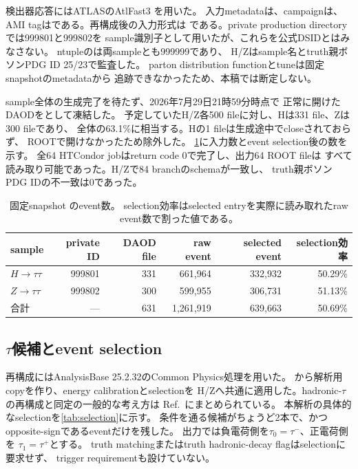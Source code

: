 \documentclass[xelatex,ja=standard,a4paper,10pt,twocolumn]{bxjsarticle}
\begin{document}
検出器応答にはATLASのAtlFast3
\cite{ATLASDetector,AtlFast3}を用いた。
入力metadataは、campaignは、
AMI tagはである。再構成後の入力形式は
である。private production directoryでは999801と999802を
sample識別子として用いたが、これらを公式DSIDとはみなさない。
ntupleのは両sampleとも999999であり、
H/Zはsample名とtruth親ボソンPDG ID 25/23で監査した。
parton distribution functionとtuneは固定snapshotのmetadataから
追跡できなかったため、本稿では断定しない。

sample全体の生成完了を待たず、2026年7月29日21時59分時点で
正常に開けたDAODをとして凍結した。
予定していたH/Z各500 fileに対し、Hは331 file、Zは300 fileであり、
全体の63.1\%に相当する。Hの1 fileは生成途中でcloseされておらず、
ROOTで開けなかったため除外した。
\cref{tab:sample_counts}に入力数とevent selection後の数を示す。
全64 HTCondor jobはreturn code 0で完了し、出力64 ROOT fileは
すべて読み取り可能であった。H/Zで84 branchのschemaが一致し、
truth親ボソンPDG IDの不一致は0であった。

\begin{table}[t]
  \centering
  \caption{固定snapshot のevent数。
    selection効率はselected entryを実際に読み取れたraw event数で割った値である。}
  \label{tab:sample_counts}
  \begin{tabular}{lrrrrr}
    \toprule
    sample & private ID & DAOD file & raw event & selected event & selection効率 \\
    \midrule
    \(H\rightarrow\tau\tau\) & 999801 & 331 & 661,964 & 332,932 & 50.29\% \\
    \(Z\rightarrow\tau\tau\) & 999802 & 300 & 599,955 & 306,731 & 51.13\% \\
    \midrule
    合計 & --- & 631 & 1,261,919 & 639,663 & 50.69\% \\
    \bottomrule
  \end{tabular}
\end{table}

\subsection{\(\tau\)候補とevent selection}
\label{subsec:selection}

再構成にはAnalysisBase 25.2.32のCommon Physics処理を用いた。
から解析用copyを作り、energy calibrationとselectionを
H/Zへ共通に適用した。hadronic-\(\tau\)の再構成と同定の一般的な考え方は
Ref.~\cite{ATLASTauID}にまとめられている。
本解析の具体的なselectionを\cref{tab:selection}に示す。
条件を通る候補がちょうど2本で、かつopposite-signであるeventだけを残した。
出力では負電荷側を\(\tau_0=\tau^-\)、正電荷側を
\(\tau_1=\tau^+\)とする。
truth matchingまたはtruth hadronic-decay flagはselectionに要求せず、
trigger requirementも設けていない。
\end{document}
